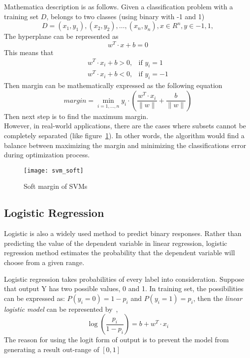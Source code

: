 Mathematica description is as follows. Given a classification problem with a training set $ D $, belongs to two classes (using binary with -1 and 1)
\begin{equation}
D={(x_1,y_1),(x_2,y_2),\dots,(x_n,y_n)},x\in R^n, y\in{-1, 1},
\end{equation}
The hyperplane can be represented as
\begin{equation}
w^T \cdot x+b=0
\end{equation}
This means that
\begin{align*}
w^T\cdot x_i+b>0,& \text{if $y_i = 1$}\\
w^T\cdot x_i+b<0,& \text{if $y_i = -1$}
\end{align*}
Then margin can be mathematically expressed as the following equation\cite{6_tan_steinbach_kumar_2005}
\begin{equation}
margin=\min_{i=1,\dots,n}y_i\cdot(\frac{w^T\cdot x_i}{\lVert w\rVert} +\frac{b}{\lVert w\rVert})
\end{equation}
Then next step is to find the maximum margin.\\


However, in real-world applications, there are the cases where subsets cannot be completely separated (like figure~\ref{fg:SVM_soft})\cite{4_kantardzic}. In other words, the algorithm would find a balance between maximizing the margin and minimizing the classifications error during optimization process.
\begin{figure}[h]
	\centering
	\texttt{[image: svm\_soft]}
	\caption{Soft margin of SVMs}
	\label{fg:SVM_soft}
\end{figure}

\subsection{Logistic Regression}
Logistic is also a widely used method to predict binary responses. Rather than predicting the value of the dependent variable in linear regression, logistic regression method estimates the probability that the dependent variable will choose from a given range\cite{4_kantardzic}.

 
Logistic regression takes probabilities of every label into consideration. Suppose that output Y has two possible values, 0 and 1. In training set, the possibilities can be expressed as: $ P(y_i=0)=1-p_i $ and $ P(y_i=1)=p_i $, then the \textit{linear logistic model} can be represented by~\cite{4_kantardzic},
\begin{equation}
	\log (\frac{p_i}{1-p_i}) = b + w^T \cdot x_i
\end{equation}
The reason for using the logit form of output is to prevent the model from generating a result out-range of $ [0, 1] $\\


